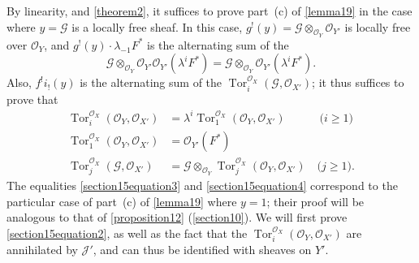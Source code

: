 \documentclass{article}
\theoremstyle{plain}
\theoremstyle{definition}
\newcommand{\sh}[1]{{\mathscr{#1}}}
\renewcommand{\geq}{\geqslant}
\DeclareMathOperator{\Tor}{Tor}
\newcommand{\oldpage}[1]{\marginpar{\footnotesize$\Big\vert$ \textit{p.~#1}}}
\begin{document}
By linearity, and \cref{theorem2}, it suffices to prove part~(c) of \cref{lemma19} in the case where $y=\sh{G}$ is a locally free sheaf.
In this case, $g^!(y)=\sh{G}\otimes_{\sh{O}_Y}\sh{O}_{Y'}$ is locally free over $\sh{O}_Y$, and $g^!(y)\cdot\lambda_{-1}F^*$ is the alternating sum of the
\[
  \sh{G} \otimes_{\sh{O}_Y} \sh{O}_{Y'} \sh{O}_{Y'}(\lambda^i F^*)
  = \sh{G} \otimes_{\sh{O}_Y} \sh{O}_{Y'}(\lambda^i F^*).
\]
Also, $f^!i_!(y)$ is the alternating sum of the $\Tor_i^{\sh{O}_X}(\sh{G},\sh{O}_{X'})$;
it thus suffices to prove that
\begin{align*}
  \label{section15equation2}
    \Tor_i^{\sh{O}_X}(\sh{O}_Y,\sh{O}_{X'}) &= \lambda^i\Tor_1^{\sh{O}_X}(\sh{O}_Y,\sh{O}_{X'})
    \qquad\quad\mbox{($i\geq1$)}
    \tag{2}
\\
  \label{section15equation3}
    \Tor_1^{\sh{O}_X}(\sh{O}_Y,\sh{O}_{X'}) &= \sh{O}_{Y'}(F^*)
    \tag{3}
\\
  \label{section15equation4}
    \Tor_j^{\sh{O}_X}(\sh{G},\sh{O}_{X'}) &= \sh{G}\otimes_{\sh{O}_Y}\Tor_j^{\sh{O}_X}(\sh{O}_Y,\sh{O}_{X'})
    \quad\mbox{($j\geq1$).}
    \tag{4}
\end{align*}
\oldpage{131}
The equalities \cref{section15equation3} and \cref{section15equation4} correspond to the particular case of part~(c) of \cref{lemma19} where $y=1$;
their proof will be analogous to that of \cref{proposition12} (\cref{section10}).
We will first prove \cref{section15equation2}, as well as the fact that the $\Tor_i^{\sh{O}_X}(\sh{O}_Y,\sh{O}_{X'})$ are annihilated by $\sh{J}'$, and can thus be identified with sheaves on $Y'$.
\end{document}

